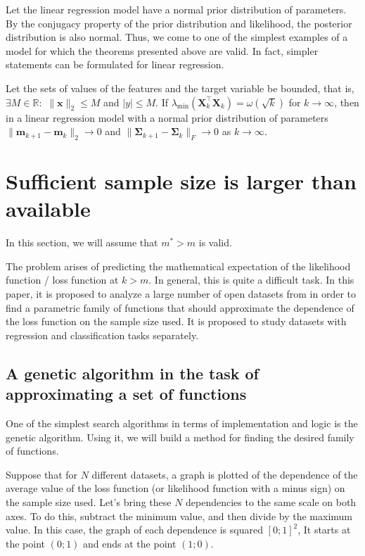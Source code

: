 \documentclass[
11pt,%
tightenlines,%
twoside,%
onecolumn,%
nofloats,%
nobibnotes,%
nofootinbib,%
superscriptaddress,%
noshowpacs,%
centertags]%
{revtex4-2}
\begin{document}
Let the linear regression model have a normal prior distribution of parameters. By the conjugacy property of the prior distribution and likelihood, the posterior distribution is also normal. Thus, we come to one of the simplest examples of a model for which the theorems presented above are valid. In fact, simpler statements can be formulated for linear regression.

\begin{theorem}[Kiselyov, 2024]\label{theorem4}
    Let the sets of values of the features and the target variable be bounded, that is, $\exists M\in \mathbb{R}:$ $\|\mathbf{x}\|_2\leqslant M$ and $|y|\leqslant M$. If $\lambda_{\min}\left(\mathbf{X}^{\top}_k \mathbf{X}_k \right) = \omega(\sqrt{k})$ for $k\to \infty$, then in a linear regression model with a normal prior distribution of parameters $\|\mathbf{m}_{k+1} - \mathbf{m}_k\|_2\to 0$ and $\|\mathbf{\Sigma}_{k+1} - \mathbf{\Sigma}_k\|_{F}\to 0$ as $k\to \infty$.
\end{theorem}

\section{Sufficient sample size is larger than available}\label{sec3}

In this section, we will assume that $m^*> m$ is valid.

The problem arises of predicting the mathematical expectation of the likelihood function / loss function at $k > m$. In general, this is quite a difficult task. In this paper, it is proposed to analyze a large number of open datasets from \citep{UCI} in order to find a parametric family of functions that should approximate the dependence of the loss function on the sample size used. It is proposed to study datasets with regression and classification tasks separately.

\subsection{A genetic algorithm in the task of approximating a set of functions}\label{ga}

One of the simplest search algorithms in terms of implementation and logic is the genetic algorithm. Using it, we will build a method for finding the desired family of functions. 

Suppose that for $N$ different datasets, a graph is plotted of the dependence of the average value of the loss function (or likelihood function with a minus sign) on the sample size used. Let's bring these $N$ dependencies to the same scale on both axes. To do this, subtract the minimum value, and then divide by the maximum value. In this case, the graph of each dependence is squared $[0; 1]^2$, It starts at the point $(0; 1)$ and ends at the point $(1; 0)$.
\end{document}

